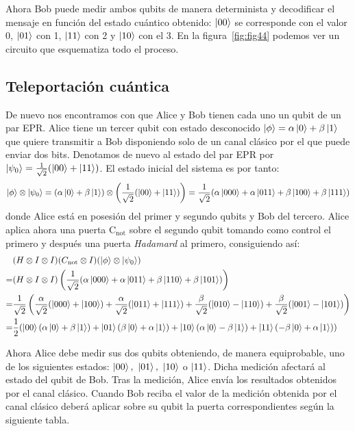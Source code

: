 Ahora Bob puede medir ambos qubits de manera determinista y decodificar el mensaje en función del estado cuántico obtenido: $\left|00\right\rangle$ se corresponde con el valor 0, $\left|01\right\rangle$ con 1, $\left|11\right\rangle$ con 2 y $\left|10\right\rangle$ con el 3. En la figura~\ref{fig:fig44} podemos ver un circuito que esquematiza todo el proceso.

\subsection{Teleportación cuántica}

De nuevo nos encontramos con que Alice y Bob tienen cada uno un qubit de un par EPR. Alice tiene un tercer qubit con estado desconocido $\left|\phi\right\rangle=\alpha\left|0\right\rangle+\beta\left|1\right\rangle$ que quiere transmitir a Bob disponiendo solo de un canal clásico por el que puede enviar dos bits. Denotamos de nuevo al estado del par EPR por $\left|\psi_0\right\rangle=\frac{1}{\sqrt{2}}(\left|00\right\rangle+\left|11\right\rangle)$. El estado inicial del sistema es por tanto:
$$\left|\phi\right\rangle\otimes\left|\psi_0\right\rangle=(\alpha\left|0\right\rangle+\beta\left|1\right\rangle)\otimes\left(\dfrac{1}{\sqrt{2}}(\left|00\right\rangle+\left|11\right\rangle)\right)=\dfrac{1}{\sqrt{2}}(\alpha\left|000\right\rangle+\alpha\left|011\right\rangle+\beta\left|100\right\rangle+\beta\left|111\right\rangle)
$$
donde Alice está en posesión del primer y segundo qubits y Bob del tercero. Alice aplica ahora una puerta C$_\textrm{not}$ sobre el segundo qubit tomando como control el primero y después una puerta \textit{Hadamard} al primero, consiguiendo así:
\[
\begin{split}
&(H\otimes I\otimes I)(C_{\textrm{not}}\otimes I)(\left|\phi\right\rangle\otimes\left|\psi_0\right\rangle)\\
=&(H\otimes I\otimes I)\left(\dfrac{1}{\sqrt{2}}(\alpha\left|000\right\rangle+\alpha\left|011\right\rangle+\beta\left|110\right\rangle+\beta\left|101\right\rangle)\right)\\
=&\dfrac{1}{\sqrt{2}}\left(\dfrac{\alpha}{\sqrt{2}}(\left|000\right\rangle+\left|100\right\rangle)+\dfrac{\alpha}{\sqrt{2}}(\left|011\right\rangle+\left|111\right\rangle)+\dfrac{\beta}{\sqrt{2}}(\left|010\right\rangle-\left|110\right\rangle)+\dfrac{\beta}{\sqrt{2}}(\left|001\right\rangle-\left|101\right\rangle)\right)\\
=&\dfrac{1}{2}(\left|00\right\rangle(\alpha\left|0\right\rangle+\beta\left|1\right\rangle)+\left|01\right\rangle(\beta\left|0\right\rangle+\alpha\left|1\right\rangle)+\left|10\right\rangle(\alpha\left|0\right\rangle-\beta\left|1\right\rangle)+\left|11\right\rangle(-\beta\left|0\right\rangle+\alpha\left|1\right\rangle))
\end{split}
\]

Ahora Alice debe medir sus dos qubits obteniendo, de manera equiprobable, uno de los siguientes estados: $\left|00\right\rangle,\ \left|01\right\rangle,\ \left|10\right\rangle$ o $\left|11\right\rangle$. Dicha medición afectará al estado del qubit de Bob. Tras la medición, Alice envía los resultados obtenidos por el canal clásico. Cuando Bob reciba el valor de la medición obtenida por el canal clásico deberá aplicar sobre su qubit la puerta correspondientes según la siguiente tabla.

